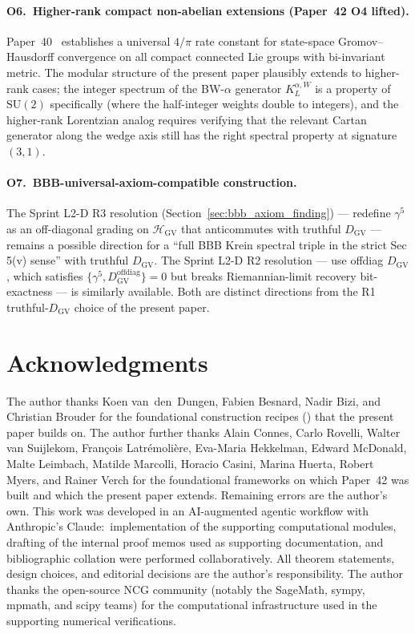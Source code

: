 \documentclass[11pt,a4paper]{article}
\theoremstyle{plain}
\theoremstyle{definition}
\newcommand{\Hilb}{\mathcal{H}}
\newcommand{\SU}{\mathrm{SU}}
\newcommand{\DGV}{D_{\mathrm{GV}}}
\newcommand{\KL}{K_{L}}
\begin{document}
\paragraph{O6.\ Higher-rank compact non-abelian extensions (Paper~42 O4
lifted).} Paper~40~\cite{paper40_unified} establishes a universal
$4/\pi$ rate constant for state-space Gromov--Hausdorff convergence on all compact
connected Lie groups with bi-invariant metric. The modular structure
of the present paper plausibly extends to higher-rank cases; the
integer spectrum of the BW-$\alpha$ generator $\KL^{\alpha, W}$ is a
property of $\SU(2)$ specifically (where the half-integer weights
double to integers), and the higher-rank Lorentzian analog requires
verifying that the relevant Cartan generator along the wedge axis
still has the right spectral property at signature $(3, 1)$.

\paragraph{O7.\ BBB-universal-axiom-compatible construction.}
The Sprint L2-D R3 resolution
(Section~\ref{sec:bbb_axiom_finding}) — redefine $\gamma^5$ as an
off-diagonal grading on $\Hilb_{\mathrm{GV}}$ that anticommutes with
truthful $\DGV$ — remains a possible direction for a ``full BBB
Krein spectral triple in the strict Sec 5(v) sense'' with truthful
$\DGV$. The Sprint L2-D R2 resolution — use offdiag $\DGV$, which
satisfies $\{\gamma^5, \DGV^{\mathrm{offdiag}}\} = 0$ but breaks
Riemannian-limit recovery bit-exactness — is similarly available. Both
are distinct directions from the R1 truthful-$\DGV$ choice of the
present paper.

\section*{Acknowledgments}

The author thanks Koen van~den~Dungen, Fabien Besnard, Nadir Bizi, and
Christian Brouder for the foundational construction recipes
(\cite{vandungen2016, bizi_brouder_besnard2018}) that the present
paper builds on. The author further thanks
Alain Connes, Carlo Rovelli, Walter van Suijlekom, Fran\c{c}ois
Latr\'emoli\`ere, Eva-Maria Hekkelman, Edward McDonald, Malte Leimbach,
Matilde Marcolli, Horacio Casini, Marina Huerta, Robert Myers, and
Rainer Verch for the foundational frameworks on which Paper~42 was
built and which the present paper extends. Remaining errors are the
author's own. This work was developed in an AI-augmented agentic
workflow with Anthropic's Claude:\ implementation of the supporting
computational modules, drafting of the internal proof memos used as
supporting documentation, and bibliographic collation were performed
collaboratively. All theorem statements, design choices, and
editorial decisions are the author's responsibility. The author
thanks the open-source NCG community (notably the SageMath, sympy,
mpmath, and scipy teams) for the computational infrastructure used in
the supporting numerical verifications.
\end{document}
